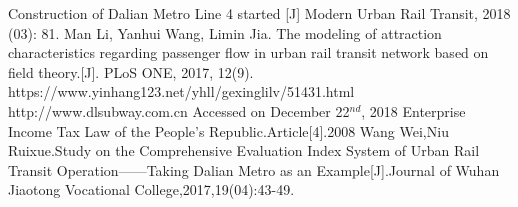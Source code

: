 \documentclass[12pt]{article}
\begin{document}
\newpage
\begin{thebibliography}{99}
 Construction of Dalian Metro Line 4 started [J] Modern Urban Rail Transit, 2018 (03): 81.
Man Li, Yanhui Wang, Limin Jia. The modeling of attraction characteristics regarding passenger flow in urban rail transit network based on field theory.[J]. PLoS ONE, 2017, 12(9).
 https://www.yinhang123.net/yhll/gexinglilv/51431.html
 http://www.dlsubway.com.cn  Accessed on December 22$^{nd}$, 2018
 Enterprise Income Tax Law of the People's Republic.Article[4].2008
 Wang Wei,Niu Ruixue.Study on the Comprehensive Evaluation Index System of Urban Rail Transit Operation——Taking Dalian Metro as an Example[J].Journal of Wuhan Jiaotong Vocational College,2017,19(04):43-49.
\end{thebibliography}
\end{document}
